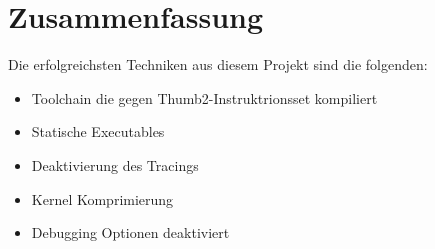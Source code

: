 
\section{Zusammenfassung}
Die erfolgreichsten Techniken aus diesem Projekt sind die folgenden:
\begin{itemize}
	\item Toolchain die gegen Thumb2-Instruktrionsset kompiliert
	\item Statische Executables
	\item Deaktivierung des Tracings
	\item Kernel Komprimierung
	\item Debugging Optionen deaktiviert
\end{itemize}

